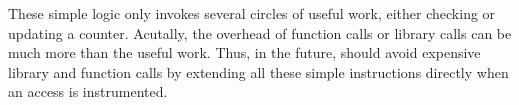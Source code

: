These simple logic only invokes several circles of useful work, either checking or updating a counter.
Acutally, the overhead of function calls or library calls can be much more than the useful work.
Thus, in the future,  should avoid expensive library and function calls by 
extending all these simple instructions directly when an access is instrumented.

